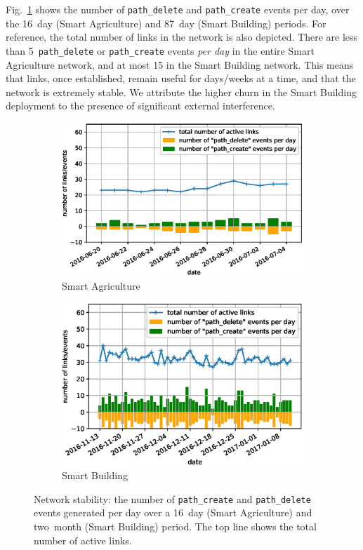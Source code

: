 \documentclass{elsarticle}
\newcommand{\building}            {Smart Building\xspace}
\newcommand{\agri}                {Smart Agriculture\xspace}
\newcommand{\pathcreate}          {{\tt path\_create}\xspace}
\newcommand{\pathdelete}          {{\tt path\_delete}\xspace}
\begin{document}

Fig.~\ref{fig:net_churn} shows the number of \pathdelete and \pathcreate events per day, over the 16~day (\agri) and 87~day (\building) periods.
For reference, the total number of links in the network is also depicted.
There are less than 5~\pathdelete or \pathcreate events \textit{per day} in the entire \agri network, and at most 15 in the \building network.
This means that links, once established, remain useful for days/weeks at a time, and that the network is extremely stable.
We attribute the higher churn in the \building deployment to the presence of significant external interference.

\begin{figure}
    \centering
    \begin{subfigure}[h]{0.49\textwidth}
        \includegraphics[width=\columnwidth]{net_churn_agri.eps}
        \caption{\agri}
    \end{subfigure}
    \begin{subfigure}[h]{0.49\textwidth}
        \includegraphics[width=\columnwidth]{net_churn_building.eps}
        \caption{\building}
    \end{subfigure}    
    \caption{
        Network stability: the number of \pathcreate and \pathdelete events generated per day over a 16~day (\agri) and two~month (\building) period.
        The top line shows the total number of active links.
    }
    \label{fig:net_churn}
\end{figure}
\end{document}
